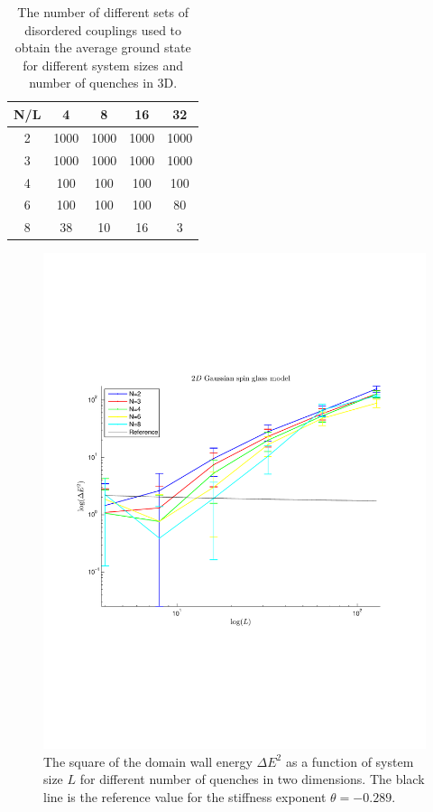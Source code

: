 \documentclass[paper=a4, fontsize=11pt]{scrartcl} %
\numberwithin{equation}{section} %
\numberwithin{figure}{section} %
\numberwithin{table}{section} %
\begin{document}
\begin{table}[h]
\centering
  \begin{tabular}{| c | c | c | c | c |}
    \hline
    N/L & 4 & 8 & 16 & 32 \\ \hline
	2 & 1000 & 1000 & 1000 & 1000 \\ \hline
	3 & 1000 & 1000 & 1000 & 1000 \\ \hline
	4 & 100 & 100 & 100 & 100 \\ \hline
	6 & 100 & 100 & 100 & 80 \\ \hline
	8 & 38 & 10 & 16 & 3 \\ \hline
  \end{tabular}
  \caption{The number of different sets of disordered couplings used to obtain the average ground state for different system sizes and number of quenches in 3D.}
  \label{tab:couplings_3D}
\end{table}

\begin{figure}
\centering
\includegraphics[width=\textwidth]{images/spinglass2D_large.pdf}
\caption{The square of the domain wall energy $\Delta E ^ 2$ as a function of system size $L$ for different number of quenches in two dimensions. The black line is the reference value for the stiffness exponent $\theta=-0.289$.}
\label{fig:E_2D_large}
\end{figure}
\end{document}
